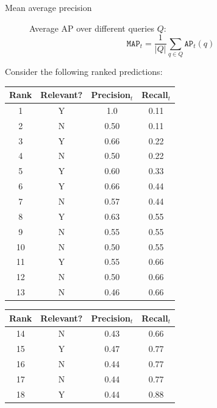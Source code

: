 \begin{description}
        \begin{description}
            \item[Mean average precision] 
                Average AP over different queries $Q$:
                \[ \texttt{MAP}_t = \frac{1}{|Q|} \sum_{q \in Q} \texttt{AP}_t(q) \]
        \end{description}
\end{description}

\begin{example}
    Consider the following ranked predictions:
    \begin{table}[H]
        \centering
        \footnotesize
        \begin{tabular}[t]{cccc}
            \toprule
            \textbf{Rank} & \textbf{Relevant?} & \textbf{Precision}$_t$ & \textbf{Recall}$_t$ \\
            \midrule
            1  & Y & 1.0 & 0.11 \\
            2  & N & 0.50 & 0.11 \\
            3  & Y & 0.66 & 0.22 \\
            4  & N & 0.50 & 0.22 \\
            5  & Y & 0.60 & 0.33 \\
            6  & Y & 0.66 & 0.44 \\
            7  & N & 0.57 & 0.44 \\
            8  & Y & 0.63 & 0.55 \\
            9  & N & 0.55 & 0.55 \\
            10 & N & 0.50 & 0.55 \\
            11 & Y & 0.55 & 0.66 \\
            12 & N & 0.50 & 0.66 \\
            13 & N & 0.46 & 0.66 \\
            \bottomrule
        \end{tabular}
        \quad
        \begin{tabular}[t]{cccc}
            \toprule
            \textbf{Rank} & \textbf{Relevant?} & \textbf{Precision}$_t$ & \textbf{Recall}$_t$ \\
            \midrule
            14 & N & 0.43 & 0.66 \\
            15 & Y & 0.47 & 0.77 \\
            16 & N & 0.44 & 0.77 \\
            17 & N & 0.44 & 0.77 \\
            18 & Y & 0.44 & 0.88 \\

\end{tabular}
\end{table}
\end{example}
